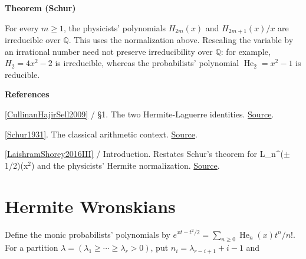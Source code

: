 \documentclass[11pt,a4paper,oneside,openany]{book}
\newenvironment{sources}{\par\smallskip\begingroup\footnotesize\color{atlasgray}\leftskip=10pt\setlength{\parskip}{2pt}}{\par\endgroup\smallskip}
\begin{document}
\begin{atlasblock}[standard]
\textbf{\sffamily Theorem (Schur)}\par\smallskip
\color{black} For every \(m\ge1\), the physicists' polynomials \(H_{2m}(x)\) and \(H_{2m+1}(x)/x\) are irreducible over \(\mathbb Q\). This uses the normalization above. Rescaling the variable by an irrational number need not preserve irreducibility over \(\mathbb Q\): for example, \(H_2=4x^2-2\) is irreducible, whereas the probabilists' polynomial \(\operatorname{He}_2=x^2-1\) is reducible.\par
\end{atlasblock}\color{black}
\begin{sources}
\textbf{References}\par\smallskip
\noindent\hyperlink{ref:CullinanHajirSell2009}{[CullinanHajirSell2009]} / §1. The two Hermite-Laguerre identities. \href{https://www.numdam.org/articles/10.5802/jtnb.659/}{Source}.\par
\noindent\hyperlink{ref:Schur1931}{[Schur1931]}. The classical arithmetic context. \href{https://doi.org/10.1515/crll.1931.165.52}{Source}.\par
\noindent\hyperlink{ref:LaishramShorey2016III}{[LaishramShorey2016III]} / Introduction. Restates Schur's theorem for L\_\allowbreak{}n\textasciicircum{}(\ensuremath{\pm}1/2)(x\ensuremath{{}^2}) and the physicists' Hermite normalization. \href{https://doi.org/10.1016/j.jnt.2016.01.003}{Source}.\par
\end{sources}\color{black}
\section{Hermite Wronskians}
\color{black} Define the monic probabilists' polynomials by \(e^{xt-t^2/2}=\sum_{n\ge0}\operatorname{He}_n(x)t^n/n!\). For a partition \(\lambda=(\lambda_1\ge\cdots\ge\lambda_r>0)\), put \(n_i=\lambda_{r-i+1}+i-1\) and\par
\end{document}
